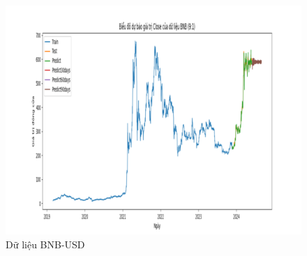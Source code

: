 \documentclass[conference]{IEEEtran}
\begin{document}
\begin{figure}[H]
    \hfill
    \begin{minipage}{0.15\textwidth}
    \centering
    \includegraphics[width=1\textwidth]{Figure/RandomForest_BNB_91.png}
    \end{minipage}
    \caption{Dữ liệu BNB-USD}
    \label{fig:1}
\end{figure}
\end{document}
